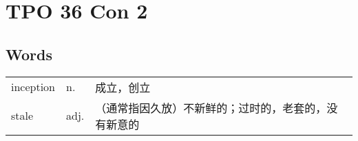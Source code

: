 \section{TPO 36 Con 2}

\subsection{Words}

\begin{tabular}{lll}
    inception & n.   & 成立，创立                      \\
    stale     & adj. & （通常指因久放）不新鲜的；过时的，老套的，没有新意的 \\
\end{tabular}

